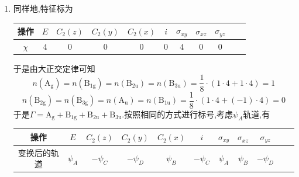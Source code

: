 \documentclass{ctexart}
\begin{document}
\begin{solution}
\begin{enumerate}[label=\tbf{(\alph*)}]
\[\begin{aligned}
        &+1\cdot(-\psi_C)+(-1)\cdot(-\psi_A)+1\cdot\psi_B+(-1)\cdot\psi_D)\\
        =\ &\dfrac14\cdot(\psi_A+\psi_B-\psi_C-\psi_D)
    \end{aligned}\]
    \[\begin{aligned}
        P^{(\text{B}_{3\text{g}})}\psi_A
        =&\ \dfrac18\cdot(1\cdot\psi_A+(-1)\cdot\psi_C+(-1)\cdot(-\psi_D)+1\cdot(-\psi_B)\\
        &+1\cdot(-\psi_C)+(-1)\cdot(-\psi_A)+(-1)\cdot\psi_B+1\cdot\psi_D)\\
        =\ &\dfrac14\cdot(\psi_A-\psi_B-\psi_C+\psi_D)
    \end{aligned}\]
    \[\begin{aligned}
        P^{(\text{A}_{\text{u}})}\psi_A
        =&\ \dfrac18\cdot(1\cdot\psi_A+(-1)\cdot\psi_C+(-1)\cdot(-\psi_D)+(-1)\cdot(-\psi_B)\\
        &+(-1)\cdot(-\psi_C)+(-1)\cdot(-\psi_A)+(-1)\cdot\psi_B+(-1)\cdot\psi_D)\\
        =\ &\dfrac14\cdot(\psi_A-\psi_B+\psi_C-\psi_D)
    \end{aligned}\]
    \item 同样地,特征标为
    \begin{table}[H]\centering
        \begin{tabular}{|c|c|c|c|c|c|c|c|c|c|c|}\hline
            操作 & $E$ & $C_2(z)$ & $C_2(y)$ & $C_2(x)$ & $i$ & $\sigma_{xy}$ & $\sigma_{xz}$ & $\sigma_{yz}$ \\\hline
            $\chi$ & $4$ & $0$ & $0$ & $0$ & $0$ & $4$ & $0$ & $0$ \\\hline
        \end{tabular}
    \end{table}
    于是由大正交定律可知
    \[n(\text{A}_\text{g})=n(\text{B}_{1\text{g}})=n(\text{B}_{2\text{u}})=n(\text{B}_{3\text{u}})=\dfrac18\cdot(1\cdot4+1\cdot4)=1\]
    \[n(\text{B}_{2\text{g}})=n(\text{B}_{3\text{g}})=n(\text{A}_{\text{u}})=n(\text{B}_{1\text{u}})=\dfrac18\cdot(1\cdot4+(-1)\cdot4)=0\]
    于是$\Gamma=\text{A}_\text{g}+\text{B}_{1\text{g}}+\text{B}_{2\text{u}}+\text{B}_{3\text{u}}$.按照相同的方式进行标号,考虑$\psi_A$轨道,有
    \begin{table}[H]\centering
        \begin{tabular}{|c|c|c|c|c|c|c|c|c|c|c|}\hline
            操作 & $E$ & $C_2(z)$ & $C_2(y)$ & $C_2(x)$ & $i$ & $\sigma_{xy}$ & $\sigma_{xz}$ & $\sigma_{yz}$ \\\hline
            变换后的轨道 & $\psi_A$ & $-\psi_C$ & $-\psi_D$ & $\psi_B$ & $-\psi_C$ & $\psi_A$ & $\psi_B$ & $-\psi_D$ \\\hline

\end{tabular}
\end{table}
\end{enumerate}
\end{solution}
\end{document}

